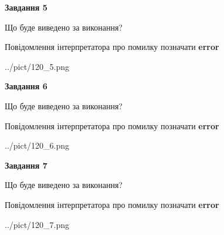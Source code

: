 \documentclass[10pt, ukrainian]{article}
\begin{document}
{\begin {large}
{\begin {center}\textbf{Завдання 5}\end {center}}\par
Що буде виведено за виконання? \par
Повідомлення інтерпретатора про помилку позначати \textbf{error}

\begin{center}
	{../pict/120_5.png}
\end{center}
\newpage

{\begin {center}\textbf{Завдання 6}\end {center}}\par
Що буде виведено за виконання? \par
Повідомлення інтерпретатора про помилку позначати \textbf{error}

\begin{center}
	{../pict/120_6.png}
\end{center}
\newpage

{\begin {center}\textbf{Завдання 7}\end {center}}\par
Що буде виведено за виконання? \par
Повідомлення інтерпретатора про помилку позначати \textbf{error}

\begin{center}
	{../pict/120_7.png}
\end{center}
\newpage

\end {large}}
\end{document}
